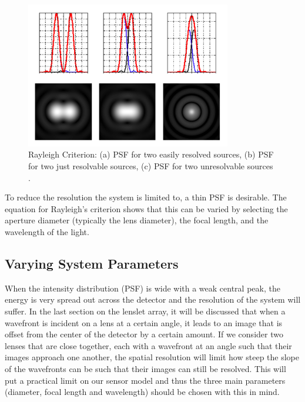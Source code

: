 \begin{figure}[H]
	\centering
		\includegraphics[width=0.8\textwidth]{figures/RayleighCriterion.png}
	\caption{Rayleigh Criterion: (a) PSF for two easily resolved sources, (b) PSF for two just resolvable sources, (c) PSF for two unresolvable sources \cite{RayleighFigure}.}
	\label{fig:Rayleigh}
\end{figure}


To reduce the resolution the system is limited to, a thin PSF is desirable.  The equation for Rayleigh's criterion shows that this can be varied by selecting the aperture diameter (typically the lens diameter), the focal length, and the wavelength of the light.  

\subsection{Varying System Parameters}
When the intensity distribution (PSF) is wide with a weak central peak, the energy is very spread out across the detector and the resolution of the system will suffer.  In the last section on the lenslet array, it will be discussed that when a wavefront is incident on a lens at a certain angle, it leads to an image that is offset from the center of the detector by a certain amount.  If we consider two lenses that are close together, each with a wavefront at an angle such that their images approach one another, the spatial resolution will limit how steep the slope of the wavefronts can be such that their images can still be resolved.  This will put a practical limit on our sensor model and thus the three main parameters (diameter, focal length and wavelength) should be chosen with this in mind.  

